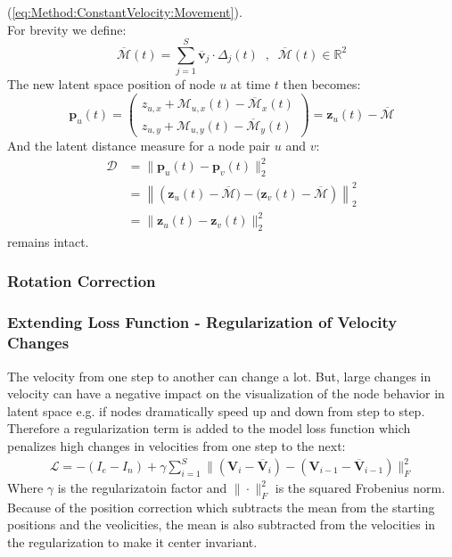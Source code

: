 (\ref{eq:Method:ConstantVelocity:Movement}).
\\
For brevity we define:
\begin{equation}
    \overline{\mathcal{M}}(t) = \sum_{j=1}^S \overline{\textbf{v}}_j \cdot \Delta_{j}(t) \;\;,\;\; \overline{\mathcal{M}}(t) \in \mathbb{R}^{2}
\end{equation}
The new latent space position of node $u$ at time $t$ then becomes:
\begin{equation}
    \textbf{p}_u(t) = 
     \begin{pmatrix}
        z_{u,x} + \mathcal{M}_{u,x}(t) - \overline{\mathcal{M}}_{x}(t) \\
        z_{u,y}+ \mathcal{M}_{u,y}(t) - \overline{\mathcal{M}}_{y}(t)
    \end{pmatrix} =
    \textbf{z}_u(t) - \overline{\mathcal{M}}
\end{equation}
And the latent distance measure for a node pair $u$ and $v$:
\begin{align}
     \mathcal{D} &= \rVert \textbf{p}_u(t) - \textbf{p}_v(t) \rVert_2^2 \\
     &= \left\rVert \left(\textbf{z}_u(t)-\overline{\mathcal{M}}) - (\textbf{z}_v(t)-\overline{\mathcal{M}}\right) \right\rVert_2^2 \\
     &= \rVert \textbf{z}_u(t) - \textbf{z}_v(t) \rVert_2^2 
\end{align}
remains intact.

\subsubsection{Rotation Correction}
\label{sec:Method:ProposedModel:RotationCorrection}


\subsubsection{Extending Loss Function - Regularization of Velocity Changes}
\label{sec:Method:ProposedModel:Regularization}
The velocity from one step to another can change a lot. But, large changes in velocity can have a negative impact on the visualization of the node behavior in latent space e.g. if nodes dramatically speed up and down from step to step.
Therefore a regularization term is added to the model loss function which penalizes high changes in velocities from one step to the next:
\begin{align}
    \mathcal{L} = - (I_e - I_n) + \gamma \sum_{i=1}^{S} \rVert (\textbf{V}_i - \overline{\textbf{V}}_i) - (\textbf{V}_{i-1} - \overline{\textbf{V}}_{i-1}) \rVert_{F}^{2}
    \label{eq:Method:ProposedModel:vec_regularization}
\end{align}
Where $\gamma$ is the regularizatoin factor and $\rVert \cdot \rVert_F^2$ is the squared Frobenius norm. Because of the position correction which subtracts the mean from the starting positions and the veolicities, the mean is also subtracted from the velocities in the regularization to make it center invariant.



